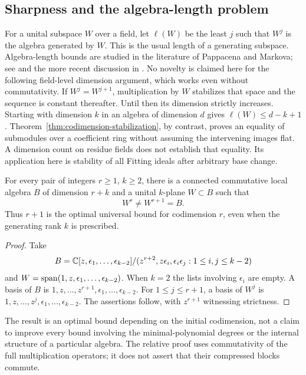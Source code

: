 \subsection{Sharpness and the algebra-length problem}
\label{sec:length-sharpness}
For a unital subspace $W$ over a field, let $\ell(W)$ be the least
$j$ such that $W^j$ is the algebra generated by $W$. This is the
usual length of a generating subspace. Algebra-length bounds are
studied in the literature of Pappacena and Markova; see
\cite{Pappacena,Markova} and the more recent discussion in
\cite[Sections 1 and 6]{Khrystik}. No novelty is claimed here for
the following field-level dimension argument, which works even
without commutativity. If $W^j=W^{j+1}$, multiplication by $W$
stabilizes that space and the sequence is constant thereafter.
Until then its dimension strictly increases. Starting with dimension
$k$ in an algebra of dimension $d$ gives $\ell(W)\le d-k+1$.
Theorem~\ref{thm:codimension-stabilization}, by contrast, proves
an equality of submodules over a coefficient ring without assuming
the intervening images flat. A dimension count on residue fields
does not establish that equality. Its application here is stability
of all Fitting ideals after arbitrary base change.

\begin{proposition}
\label{prop:codimension-sharpness}
For every pair of integers $r\ge1$, $k\ge2$, there is a connected
commutative local algebra $B$ of dimension $r+k$ and a unital
$k$-plane $W\subset B$ such that
\[
 W^r\ne W^{r+1}=B.
\]
Thus $r+1$ is the optimal universal bound for codimension $r$,
even when the generating rank $k$ is prescribed.
\end{proposition}
\begin{proof}
Take
\[
 B=\mathbb C[z,\epsilon_1,\ldots,\epsilon_{k-2}]/
 (z^{r+2},z\epsilon_i,\epsilon_i\epsilon_j:1\le i,j\le k-2)
\]
and $W=\operatorname{span}(1,z,\epsilon_1,\ldots,\epsilon_{k-2})$.
When $k=2$ the lists involving $\epsilon_i$ are empty.
A basis of $B$ is $1,z,\ldots,z^{r+1},\epsilon_1,\ldots,
\epsilon_{k-2}$. For $1\le j\le r+1$, a basis of $W^j$ is
$1,z,\ldots,z^j,\epsilon_1,\ldots,\epsilon_{k-2}$.
The assertions follow, with $z^{r+1}$ witnessing strictness.
\end{proof}

The result is an optimal bound depending on the initial codimension,
not a claim to improve every bound involving the minimal-polynomial
degrees or the internal structure of a particular algebra. The
relative proof uses commutativity of the full multiplication operators;
it does not assert that their compressed blocks commute.
